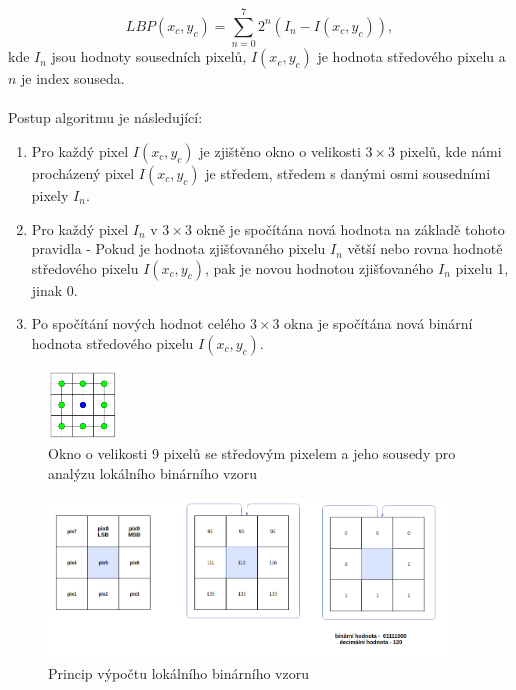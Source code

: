 $$LBP(x_c,y_c) = \sum_{n=0}^{7}2^n(I_n-I(x_c,y_c)),$$
kde $I_n$ jsou hodnoty sousedních pixelů, $I(x_c,y_c)$ je hodnota středového pixelu a $n$ je index souseda. \cite{GaikwadStudy}\\\\
Postup algoritmu je následující:\\
\begin{enumerate}
    \item Pro každý pixel $I(x_c,y_c)$ je zjištěno okno o velikosti $3\times3$ pixelů, kde námi procházený pixel $I(x_c,y_c)$ je středem, středem s danými osmi sousedními pixely $I_n$.
    \item Pro každý pixel $I_n$ v $3\times3$ okně je spočítána nová hodnota na základě tohoto pravidla - Pokud je hodnota zjišťovaného pixelu $I_n$ větší nebo rovna hodnotě středového pixelu $I(x_c,y_c)$, pak je novou hodnotou zjišťovaného $I_n$ pixelu 1, jinak 0.
    \item Po spočítání nových hodnot celého $3\times3$ okna je spočítána nová binární hodnota středového pixelu $I(x_c,y_c)$.
\end{enumerate}

\begin{figure}[!htbp]
    \centering
    \includegraphics[width=70px]{obrazky-figures/lbpn.png}
    \caption{Okno o velikosti 9 pixelů se středovým pixelem a jeho sousedy pro analýzu lokálního binárního vzoru \cite{GragnanielloStudy}}
\end{figure}

\begin{figure}[!htbp]
    \centering
    \includegraphics[width=400px]{obrazky-figures/lbpprincip.png}
    \caption{Princip výpočtu lokálního binárního vzoru}
\end{figure}

